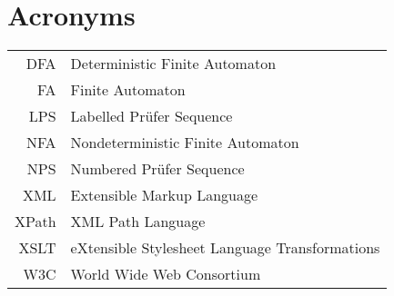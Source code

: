 \documentclass[english,bachelor,unicode]{ctufit-thesis}
\theoremstyle{plain}
\theoremstyle{definition}
\theoremstyle{remark}
\numberwithin{theorem}{chapter}
\begin{document}
	\chapter{Acronyms} %
	\begin{tabular}{rl}
		DFA & Deterministic Finite Automaton\\
		FA & Finite Automaton\\
		LPS & Labelled Prüfer Sequence\\
		NFA & Nondeterministic Finite Automaton\\
		NPS & Numbered Prüfer Sequence\\
		XML & Extensible Markup Language\\
		XPath & XML Path Language\\
		XSLT & eXtensible Stylesheet Language Transformations\\
		W3C & World Wide Web Consortium
	\end{tabular}
	
	\mainmatter\mainmatterinit

	
	
	
	
	
	
	
	
	
	\backmatter
	\printbibliography	
\end{document}
